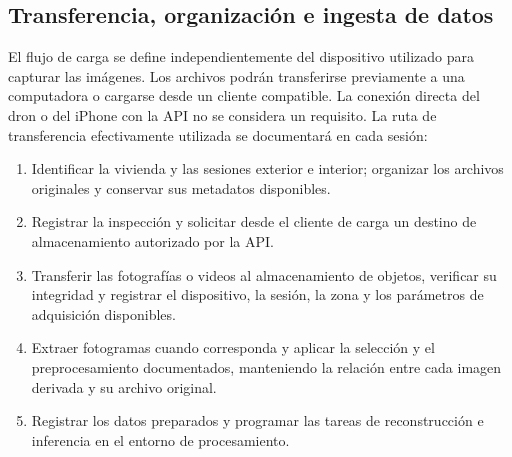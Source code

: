 \documentclass[12pt,oneside]{report}
\begin{document}
\subsection{Transferencia, organización e ingesta de datos}
El flujo de carga se define independientemente del dispositivo utilizado para capturar las imágenes. Los archivos podrán transferirse previamente a una computadora o cargarse desde un cliente compatible. La conexión directa del dron o del iPhone con la API no se considera un requisito. La ruta de transferencia efectivamente utilizada se documentará en cada sesión:
\begin{enumerate}
    \item Identificar la vivienda y las sesiones exterior e interior; organizar los archivos originales y conservar sus metadatos disponibles.
    \item Registrar la inspección y solicitar desde el cliente de carga un destino de almacenamiento autorizado por la API.
    \item Transferir las fotografías o videos al almacenamiento de objetos, verificar su integridad y registrar el dispositivo, la sesión, la zona y los parámetros de adquisición disponibles.
    \item Extraer fotogramas cuando corresponda y aplicar la selección y el preprocesamiento documentados, manteniendo la relación entre cada imagen derivada y su archivo original.
    \item Registrar los datos preparados y programar las tareas de reconstrucción e inferencia en el entorno de procesamiento.
\end{enumerate}
\end{document}
